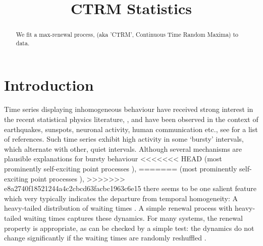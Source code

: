 \documentclass[12pt]{article}
\theoremstyle{definition}
\theoremstyle{remark}
\numberwithin{equation}{section}
\newcommand{\1}{\mathbf 1}
\begin{document}

\title{CTRM Statistics}
\maketitle
\begin{abstract}
We fit a max-renewal process, (aka 'CTRM', Continuous Time Random Maxima)
to data. 

\end{abstract}


\section{Introduction}

Time series displaying inhomogeneous behaviour have received strong interest in 
the recent statistical physics literature,
\cite{Barabasi2005,Oliveira2005,Vasquez2006,Vazquez2007,Omi2011,
Min2010,Karsai2011,Bagrow2013},
and have been observed in the context of earthquakes, sunspots, neuronal
activity, human communication etc., see \cite{Karsai2012,Vajna2013} for a 
list of references.
Such time series exhibit high activity in some `bursty' intervals, which 
alternate with other, quiet intervals.  Although several mechanisms are 
plausible explanations for bursty behaviour
<<<<<<< HEAD
(most prominently self-exciting point processes \cite{hawkes1971point}),
=======
(most prominently self-exciting point processes \cite{Hawkes1971}),
>>>>>>> e8a2740f18521244a4c2cbcd63facbc1963c6e15
there seems to be one salient
feature which very typically indicates the departure from temporal homogeneity: 
A heavy-tailed distribution of waiting times
\cite{Vasquez2006,Karsai2012,Vajna2013}. 
A simple renewal process with heavy-tailed waiting times captures these
dynamics. For many systems, the renewal property is appropriate, as can be
checked by a simple test: the dynamics do not change significantly if the
waiting times are randomly reshuffled \cite{Karsai2012}.
\end{document}
